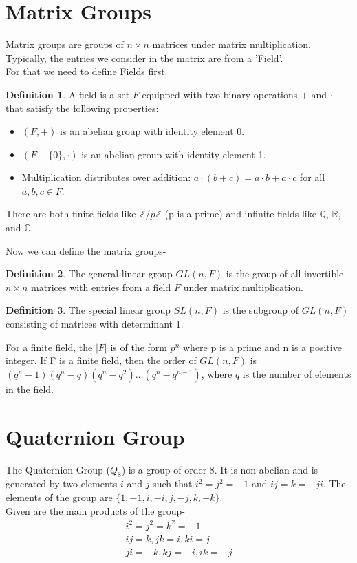 \documentclass[12pt,a4paper,oneside]{report}
\theoremstyle{definition}
\newtheorem{definition}{Definition}[chapter]
\begin{document}
\section{Matrix Groups}
Matrix groups are groups of $n \times n$ matrices under matrix multiplication. Typically, the entries we consider in the matrix are from a 'Field'.
\\For that we need to define Fields first.
\begin{definition}
  A field is a set $F$ equipped with two binary operations $+$ and $\cdot$ that satisfy the following properties:
  \begin{itemize}
    \item $(F, +)$ is an abelian group with identity element 0.
    \item $(F - \{0\}, \cdot)$ is an abelian group with identity element 1.
    \item Multiplication distributes over addition: $a \cdot (b + c) = a \cdot b + a \cdot c$ for all $a, b, c \in F$.
  \end{itemize}
\end{definition}
There are both finite fields like $\mathbb{Z}/p\mathbb{Z}$ (p is a prime) and infinite fields like $\mathbb{Q}$, $\mathbb{R}$, and $\mathbb{C}$.

Now we can define the matrix groups-
\begin{definition}
  The general linear group $GL(n, F)$ is the group of all invertible $n \times n$ matrices with entries from a field $F$ under matrix multiplication.
\end{definition}
\begin{definition}
  The special linear group $SL(n, F)$ is the subgroup of $GL(n, F)$ consisting of matrices with determinant 1.
\end{definition}
For a finite field, the $|F|$ is of the form $p^n$ where p is a prime and n is a positive integer. 
If F is a finite field, then the order of $GL(n, F)$ is $(q^{n} - 1)(q^{n} - q)(q^{n} - q^2) \ldots (q^{n} - q^{n-1})$, where $q$ is the number of elements in the field.
\section{Quaternion Group}
The Quaternion Group ($Q_8$) is a group of order 8. It is non-abelian and is generated by two elements $i$ and $j$ such that $i^2 = j^2 = -1$ and $ij = k = -ji$. The elements of the group are $\{1, -1, i, -i, j, -j, k, -k\}$.
\\Given are the main products of the group-
\begin{align*}
  i^2=j^2=k^2=-1
  \\ij=k, jk=i, ki=j
  \\ji=-k, kj=-i, ik=-j
\end{align*}
\end{document}
